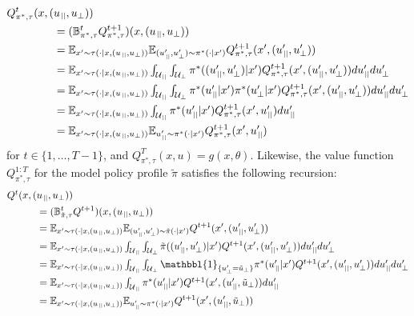 %
\begin{align}
Q_{\pi^{*},\tau}^{t}(x,(&u_{\para},u_{\bot}))
\\
&
=
(\mathbb{B}_{\pi^{*},\tau}^{t}Q_{\pi^{*},\tau}^{t+1})
(x,(u_{\para},u_{\bot}))
\\
&
=
\mathbb{E}_{x'\sim\tau(\cdot|x,(u_{\para},u_{\bot}))}
\mathbb{E}_{(u_{\para}',u_{\bot}')\sim\pi^{*}(\cdot|x')}
Q_{\pi^{*},\tau}^{t+1}(x',(u_{\para}',u_{\bot}'))
\\
&
=
\mathbb{E}_{x'\sim\tau(\cdot|x,(u_{\para},u_{\bot}))}
\textstyle\int_{\mathcal{U}_{\para}}
\textstyle\int_{\mathcal{U}_{\bot}}
\pi^{*}((u_{\para}',u_{\bot}')|x')
Q_{\pi^{*},\tau}^{t+1}(x',(u_{\para}',u_{\bot}'))
du_{\para}'du_{\bot}'
\\
&
=
\mathbb{E}_{x'\sim\tau(\cdot|x,(u_{\para},u_{\bot}))}
\textstyle\int_{\mathcal{U}_{\para}}
\textstyle\int_{\mathcal{U}_{\bot}}
\pi^{*}(u_{\para}'|x')
\pi^{*}(u_{\bot}'|x')
Q_{\pi^{*},\tau}^{t+1}(x',(u_{\para}',u_{\bot}'))
du_{\para}'du_{\bot}'
\\
&
=
\mathbb{E}_{x'\sim\tau(\cdot|x,(u_{\para},u_{\bot}))}
\textstyle\int_{\mathcal{U}_{\para}}
\pi^{*}(u_{\para}'|x')
Q_{\pi^{*},\tau}^{t+1}(x',u_{\para}')
du_{\para}'
\\
&
=
\mathbb{E}_{x'\sim\tau(\cdot|x,(u_{\para},u_{\bot}))}
\mathbb{E}_{u_{\para}'\sim\pi^{*}(\cdot|x')}
Q_{\pi^{*},\tau}^{t+1}(x',u_{\para}')
\end{align}
for $t\in\{1,\dots,T-1\}$, and $Q_{\pi^{*},\tau}^{T}(x,u)=g(x,\theta)$.
%
Likewise, the value function $Q_{\pi^{*},\tau}^{1:T}$ for the model policy profile $\tilde{\pi}$ satisfies the following recursion:
%
\begin{align}\textstyle
Q^{t}(x,(&u_{\para},u_{\bot}))
\\
&
=
(\mathbb{B}_{\tilde{\pi},\tau}^{t}Q^{t+1})
(x,(u_{\para},u_{\bot}))
\\
&
=
\mathbb{E}_{x'\sim\tau(\cdot|x,(u_{\para},u_{\bot}))}
\mathbb{E}_{(u_{\para}',u_{\bot}')\sim\tilde{\pi}(\cdot|x')}
Q^{t+1}(x',(u_{\para}',u_{\bot}'))
\\
&
=
\mathbb{E}_{x'\sim\tau(\cdot|x,(u_{\para},u_{\bot}))}
\textstyle\int_{\mathcal{U}_{\para}}
\textstyle\int_{\mathcal{U}_{\bot}}
\tilde{\pi}((u_{\para}',u_{\bot}')|x')
Q^{t+1}(x',(u_{\para}',u_{\bot}'))
du_{\para}'du_{\bot}'
\\
&
=
\mathbb{E}_{x'\sim\tau(\cdot|x,(u_{\para},u_{\bot}))}
\textstyle\int_{\mathcal{U}_{\para}}
\textstyle\int_{\mathcal{U}_{\bot}}
\mathbbl{1}_{\{u_{\bot}'=\tilde{u}_{\bot}\}}
\pi^{*}(u_{\para}'|x')
Q^{t+1}(x',(u_{\para}',u_{\bot}'))
du_{\para}'du_{\bot}'
\\
&
=
\mathbb{E}_{x'\sim\tau(\cdot|x,(u_{\para},u_{\bot}))}
\textstyle\int_{\mathcal{U}_{\para}}
\pi^{*}(u_{\para}'|x')
Q^{t+1}(x',(u_{\para}',\tilde{u}_{\bot}))
du_{\para}'
\\
&
=
\mathbb{E}_{x'\sim\tau(\cdot|x,(u_{\para},u_{\bot}))}
\mathbb{E}_{u_{\para}'\sim\pi^{*}(\cdot|x')}
Q^{t+1}(x',(u_{\para}',\tilde{u}_{\bot}))
\end{align}
